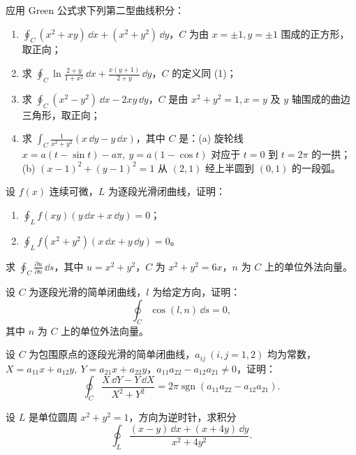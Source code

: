 \begin{xexercise}[1]
应用 Green 公式求下列第二型曲线积分：
\begin{enumerate}[label=(\arabic*)]
  \item $\displaystyle\oint_C(x^2+xy)\,\dd x+(x^2+y^2)\,\dd y$，$C$ 为由 $x=\pm1,y=\pm1$ 围成的正方形，取正向；
  \item 求 $\displaystyle\oint_C\ln\frac{2+y}{1+x^2}\,\dd x+\frac{x(y+1)}{2+y}\,\dd y$，$C$ 的定义同 (1)；
  \item 求 $\displaystyle\oint_C(x^2-y^2)\,\dd x-2xy\,\dd y$，$C$ 是由 $x^2+y^2=1,x=y$ 及 $y$ 轴围成的曲边三角形，取正向；
  \item 求 $\displaystyle\int_C\frac1{x^2+y^2}(x\,\dd y-y\,\dd x)$，其中 $C$ 是：(a) 旋轮线 $x=a(t-\sin t)-a\pi,\ y=a(1-\cos t)$ 对应于 $t=0$ 到 $t=2\pi$ 的一拱；(b) $(x-1)^2+(y-1)^2=1$ 从 $(2,1)$ 经上半圆到 $(0,1)$ 的一段弧。
\end{enumerate}
\end{xexercise}\begin{xexercise}[2]
设 $f(x)$ 连续可微，$L$ 为逐段光滑闭曲线，证明：
\begin{enumerate}[label=(\arabic*)]
  \item $\displaystyle\oint_Lf(xy)(y\,\dd x+x\,\dd y)=0$；
  \item $\displaystyle\oint_Lf(x^2+y^2)(x\,\dd x+y\,\dd y)=0$。
\end{enumerate}
\end{xexercise}\begin{xexercise}[3]
求 $\displaystyle\oint_C\frac{\partial u}{\partial n}\,\dd s$，其中 $u=x^2+y^2$，$C$ 为 $x^2+y^2=6x$，$n$ 为 $C$ 上的单位外法向量。
\end{xexercise}\begin{xexercise}[4]
设 $C$ 为逐段光滑的简单闭曲线，$l$ 为给定方向，证明：
\[
  \oint_C\cos(l,n)\,\dd s=0,
\]
其中 $n$ 为 $C$ 上的单位外法向量。
\end{xexercise}\begin{xexercise}[5]
设 $C$ 为包围原点的逐段光滑的简单闭曲线，$a_{ij}\ (i,j=1,2)$ 均为常数，$X=a_{11}x+a_{12}y,\ Y=a_{21}x+a_{22}y$，$a_{11}a_{22}-a_{12}a_{21}\ne0$，证明：
\[
  \oint_C\frac{X\,\dd Y-Y\,\dd X}{X^2+Y^2}=2\pi\operatorname{sgn}(a_{11}a_{22}-a_{12}a_{21}).
\]
\end{xexercise}\begin{xexercise}[6]
设 $L$ 是单位圆周 $x^2+y^2=1$，方向为逆时针，求积分
\[
  \oint_L\frac{(x-y)\,\dd x+(x+4y)\,\dd y}{x^2+4y^2}.
\]
\end{xexercise}\begin{xexercise}[7]

\end{xexercise}
